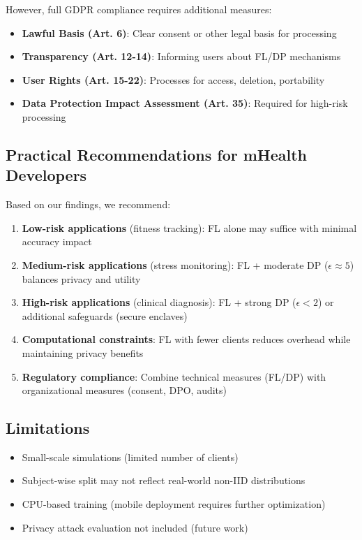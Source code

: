 \documentclass[conference]{IEEEtran}
\begin{document}
However, full GDPR compliance requires additional measures:

\begin{itemize}
    \item \textbf{Lawful Basis (Art. 6)}: Clear consent or other legal basis for processing
    \item \textbf{Transparency (Art. 12-14)}: Informing users about FL/DP mechanisms
    \item \textbf{User Rights (Art. 15-22)}: Processes for access, deletion, portability
    \item \textbf{Data Protection Impact Assessment (Art. 35)}: Required for high-risk processing
\end{itemize}

\subsection{Practical Recommendations for mHealth Developers}

Based on our findings, we recommend:

\begin{enumerate}
    \item \textbf{Low-risk applications} (fitness tracking): FL alone may suffice with minimal accuracy impact
    
    \item \textbf{Medium-risk applications} (stress monitoring): FL + moderate DP ($\epsilon \approx 5$) balances privacy and utility
    
    \item \textbf{High-risk applications} (clinical diagnosis): FL + strong DP ($\epsilon < 2$) or additional safeguards (secure enclaves)
    
    \item \textbf{Computational constraints}: FL with fewer clients reduces overhead while maintaining privacy benefits
    
    \item \textbf{Regulatory compliance}: Combine technical measures (FL/DP) with organizational measures (consent, DPO, audits)
\end{enumerate}

\subsection{Limitations}

\begin{itemize}
    \item Small-scale simulations (limited number of clients)
    \item Subject-wise split may not reflect real-world non-IID distributions
    \item CPU-based training (mobile deployment requires further optimization)
    \item Privacy attack evaluation not included (future work)
\end{itemize}
\end{document}
